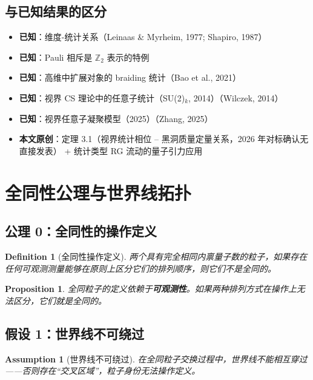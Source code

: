 \documentclass[11pt,a4paper]{article}
\newtheorem{definition}{Definition}[section]
\newtheorem{proposition}{Proposition}[section]
\newtheorem{assumption}{Assumption}[section]
\begin{document}
\subsection{与已知结果的区分}

\begin{itemize}
\item \textbf{已知}：维度-统计关系（Leinaas \& Myrheim, 1977; Shapiro, 1987）
\item \textbf{已知}：Pauli 相斥是 $\mathbb{Z}_2$ 表示的特例
\item \textbf{已知}：高维中扩展对象的 braiding 统计（Bao et al., 2021）
\item \textbf{已知}：视界 CS 理论中的任意子统计（SU(2)${}_k$, 2014）（Wilczek, 2014）
\item \textbf{已知}：视界任意子凝聚模型（2025）（Zhang, 2025）
\item \textbf{本文原创}：定理 3.1（视界统计相位 -- 黑洞质量定量关系，2026 年对标确认无直接发表） +
统计类型 RG 流动的量子引力应用
\end{itemize}

\section{全同性公理与世界线拓扑}

\subsection{公理 0：全同性的操作定义}

\begin{definition}[全同性操作定义]
两个具有完全相同内禀量子数的粒子，如果存在任何可观测测量能够在原则上区分它们的排列顺序，则它们不是全同的。
\end{definition}

\begin{proposition}
全同粒子的定义依赖于\textbf{可观测性}。如果两种排列方式在操作上无法区分，它们就是全同的。
\end{proposition}

\subsection{假设 1：世界线不可绕过}

\begin{assumption}[世界线不可绕过]
在全同粒子交换过程中，世界线不能相互穿过——否则存在``交叉区域''，粒子身份无法操作定义。
\end{assumption}
\end{document}

